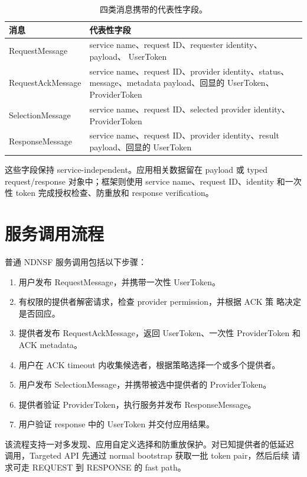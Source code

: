 \begin{table}[H]
\centering
\caption{四类消息携带的代表性字段。}
\label{tab:ndnsf-message-fields-ch}
\begin{tabularx}{\textwidth}{p{}X}
\toprule
消息 & 代表性字段 \\
\midrule
RequestMessage & service name、request ID、requester identity、payload、
UserToken \\
RequestAckMessage & service name、request ID、provider identity、status、
message、metadata payload、回显的 UserToken、ProviderToken \\
SelectionMessage & service name、request ID、selected provider identity、
ProviderToken \\
ResponseMessage & service name、request ID、provider identity、result
payload、回显的 UserToken \\
\bottomrule
\end{tabularx}
\end{table}

这些字段保持 service-independent。应用相关数据留在 payload 或 typed
request/response 对象中；框架则使用 service name、request ID、identity
和一次性 token 完成授权检查、防重放和 response verification。

\section{服务调用流程}

普通 NDNSF 服务调用包括以下步骤：

\begin{enumerate}[leftmargin=*]
  \item 用户发布 RequestMessage，并携带一次性 UserToken。
  \item 有权限的提供者解密请求，检查 provider permission，并根据 ACK 策
  略决定是否回应。
  \item 提供者发布 RequestAckMessage，返回 UserToken、一次性
  ProviderToken 和 ACK metadata。
  \item 用户在 ACK timeout 内收集候选者，根据策略选择一个或多个提供者。
  \item 用户发布 SelectionMessage，并携带被选中提供者的 ProviderToken。
  \item 提供者验证 ProviderToken，执行服务并发布 ResponseMessage。
  \item 用户验证 response 中的 UserToken 并交付应用结果。
\end{enumerate}

该流程支持一对多发现、应用自定义选择和防重放保护。对已知提供者的低延迟
调用，Targeted API 先通过 normal bootstrap 获取一批 token pair，然后后续
请求可走 REQUEST 到 RESPONSE 的 fast path。


